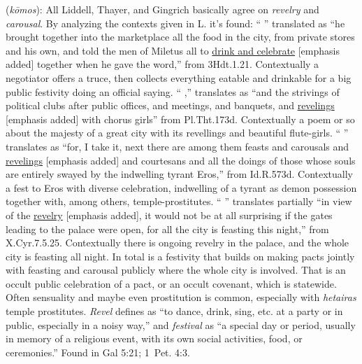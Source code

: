 \item[Revel,]

(\textit{kōmos}):
All Liddell, Thayer, and Gingrich basically agree on \emph{revelry} and \emph{carousal}. By analyzing the contexts given in L. it's found: `` \underline{} '' translated as ``he brought together into the marketplace all the food in the city, from private stores and his own, and told the men of Miletus all to \underline{drink and celebrate} [emphasis added] together when he gave the word,'' from 3Hdt.1.21. Contextually a negotiator offers a truce, then collects everything eatable and drinkable for a big public festivity doing an official saying. `` \underline{},'' translates as ``and the strivings of political clubs after public offices, and meetings, and banquets, and \underline{revelings} [emphasis added] with chorus girls'' from Pl.Tht.173d. Contextually a poem or so about the majesty of a great city with its revellings and beautiful flute-girls. `` \underline{} '' translates as ``for, I take it, next there are among them feasts and carousals and \underline{revelings} [emphasis added] and courtesans and all the doings of those whose souls are entirely swayed by the indwelling tyrant Eros,'' from Id.R.573d. Contextually a fest to Eros with diverse celebration, indwelling of a tyrant as demon possession together with, among others, temple-prostitutes. ``\underline{} '' translates partially ``in view of the \underline{revelry} [emphasis added], it would not be at all surprising if the gates leading to the palace were open, for all the city is feasting this night,'' from X.Cyr.7.5.25. Contextually there is ongoing revelry in the palace, and the whole city is feasting all night. In total  is a festivity that builds on making pacts jointly with feasting and carousal publicly where the whole city is involved. That is an occult public celebration of a pact, or an occult covenant, which is statewide. Often sensuality and maybe even prostitution is common, especially with \emph{hetairas} temple prostitutes. \emph{Revel} defines as ``to dance, drink, sing, etc. at a party or in public, especially in a noisy way,'' and \emph{festival} as ``a special day or period, usually in memory of a religious event, with its own social activities, food, or ceremonies.''
Found in Gal 5:21; 1~Pet. 4:3.
